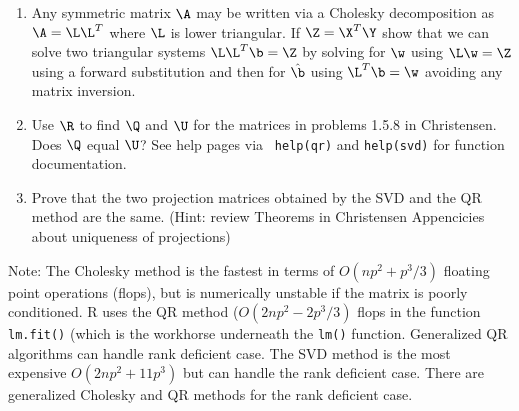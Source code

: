 \documentclass[12pt]{article}
\begin{document}
\begin{enumerate}
\begin{enumerate}
\item Any symmetric matrix $\A$ may be written via a Cholesky
  decomposition as $\A = \L \L^T$ where $\L$
  is lower triangular.   If $\Z = \X^T\Y$  show that we can solve two
  triangular systems $\L \L^T \b = \Z$ by solving for $\w$ using  $\L \w = \Z$ using a
  forward substitution and then for $\hat{\b}$ using $\L^T \b =
  \w$ avoiding any matrix inversion.

\item Use $\R$ to find $\Q$ and $\U$ for the matrices in problems 1.5.8 in
  Christensen. Does $\Q$ equal $\U$?   See help pages via {\tt
    help(qr)} and {\tt help(svd)} for function documentation.
\item Prove that the two projection matrices obtained by the SVD and
  the QR method are the same.  (Hint:  review Theorems in Christensen
  Appencicies about uniqueness of projections)

  \end{enumerate}
  Note: The Cholesky method is the fastest in terms of
  $O(n p^2 + p^3/3)$ floating point operations (flops), but is
  numerically unstable if the matrix is poorly conditioned.  R uses
  the QR method ($O(2 n p^2 - 2p^3/3)$ flops in the function {\tt lm.fit()}
  (which is the workhorse underneath the {\tt lm()} function.  Generalized QR
  algorithms can handle rank deficient case.  The SVD method is the
  most expensive $O(2 n p^2 + 11 p^3)$ but can handle the rank deficient case.
  There are generalized Cholesky and QR methods for the rank deficient
  case.
\end{enumerate}
\end{document}
